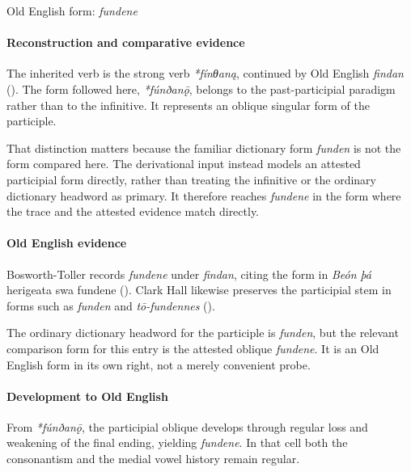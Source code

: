 \documentclass[
  british,
  a4paper,
]{article}
\begin{document}
Old English form: \emph{fundene}

\paragraph{Reconstruction and comparative
evidence}\label{reconstruction-and-comparative-evidence-43}

The inherited verb is the strong verb \emph{*fínθaną}, continued by Old
English \emph{findan} (). The form followed here, \emph{*fúnðanǭ}, belongs to the
past-participial paradigm rather than to the infinitive. It represents
an oblique singular form of the participle.

That distinction matters because the familiar dictionary form
\emph{funden} is not the form compared here. The derivational input
instead models an attested participial form directly, rather than
treating the infinitive or the ordinary dictionary headword as primary.
It therefore reaches \emph{fundene} in the form where the trace and the
attested evidence match directly.

\paragraph{Old English evidence}\label{old-english-evidence-43}

Bosworth-Toller records \emph{fundene} under \emph{findan}, citing the
form in \emph{Beón} \emph{þá} herigeata swa fundene
().
Clark Hall likewise preserves the participial stem in forms such as
\emph{funden} and \emph{tō-fundennes}
().

The ordinary dictionary headword for the participle is \emph{funden},
but the relevant comparison form for this entry is the attested oblique
\emph{fundene}. It is an Old English form in its own right, not a merely
convenient probe.

\paragraph{Development to Old
English}\label{development-to-old-english-43}

From \emph{*fúnðanǭ}, the participial oblique develops through regular
loss and weakening of the final ending, yielding \emph{fundene}. In that
cell both the consonantism and the medial vowel history remain regular.
\end{document}

